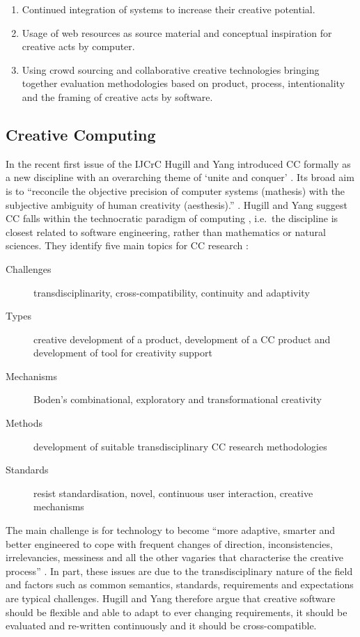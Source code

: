 \begin{enumerate}
  \item Continued integration of systems to increase their creative potential.
  \item Usage of web resources as source material and conceptual inspiration for creative acts by computer.
  \item Using crowd sourcing and collaborative creative technologies bringing together evaluation methodologies based on product, process, intentionality and the framing of creative acts by software.
\end{enumerate}


\subsection{Creative Computing}

In the recent first issue of the \ac{IJCrC} Hugill and Yang introduced \ac{CC} formally as a new discipline \citeyear{Hugill2013c} with an overarching theme of `unite and conquer' \autocite[p.1, his emphasis]{Yang2013}. Its broad aim is to ``reconcile the objective precision of computer systems (mathesis) with the subjective ambiguity of human creativity (aesthesis).'' \autocite[p.5]{Hugill2013c}. Hugill and Yang suggest \ac{CC} falls within the technocratic paradigm of computing \autocite[see also][p.8]{Eden2007}, i.e.\ the discipline is closest related to software engineering, rather than mathematics or natural sciences. They identify five main topics for \ac{CC} research \autocite[p.15-17]{Hugill2013c}:

\begin{description}
  \item [Challenges] transdisciplinarity, cross-compatibility, continuity and adaptivity
  \item [Types] creative development of a product, development of a \ac{CC} product and development of tool for creativity support
  \item [Mechanisms]	Boden’s combinational, exploratory and transformational creativity
  \item [Methods] development of suitable transdisciplinary \ac{CC} research methodologies
  \item [Standards] resist standardisation, novel, continuous user interaction, creative mechanisms
\end{description}

The main challenge is for technology  to become ``more adaptive, smarter and better engineered to cope with frequent changes of direction, inconsistencies, irrelevancies, messiness and all the other vagaries that characterise the creative process'' \autocite[p.5]{Hugill2013c}. In part, these issues are due to the transdisciplinary nature of the field and factors such as common semantics, standards, requirements and expectations are typical challenges. Hugill and Yang therefore argue that creative software should be flexible and able to adapt to ever changing requirements, it should be evaluated and re-written continuously and it should be cross-compatible.

